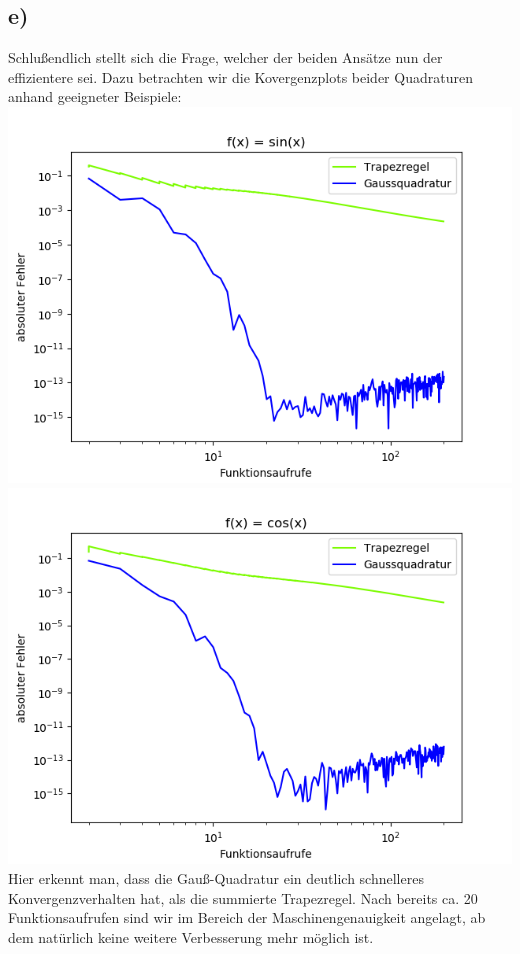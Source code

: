 \subsection*{e)}
Schlußendlich stellt sich die Frage, welcher der beiden Ansätze nun der effizientere sei. Dazu betrachten wir die Kovergenzplots beider Quadraturen anhand geeigneter Beispiele:
\includegraphics[width=0.5\linewidth]{gauss-trapez.png}
\includegraphics[width=0.5\linewidth]{gauss-trapez,cos.png}
Hier erkennt man, dass die Gauß-Quadratur ein deutlich schnelleres Konvergenzverhalten hat, als die summierte Trapezregel. Nach bereits ca. 20 Funktionsaufrufen sind wir im Bereich der Maschinengenauigkeit angelagt, ab dem natürlich keine weitere Verbesserung mehr möglich ist.

